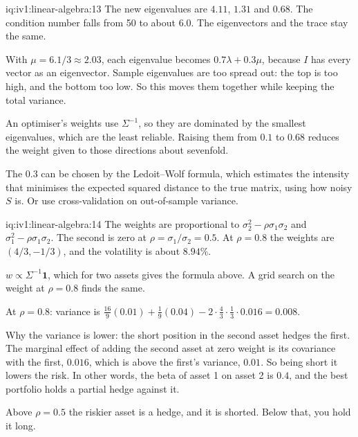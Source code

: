 \begin{solution}{iq:iv1:linear-algebra:13}
The new eigenvalues are $4.11$, $1.31$ and $0.68$. The condition number falls from 50 to about $6.0$. The eigenvectors and the trace stay the same.

With $\mu = 6.1/3 \approx 2.03$, each eigenvalue becomes $0.7\lambda + 0.3\mu$, because $I$ has every vector as an eigenvector. Sample eigenvalues are too spread out: the top is too high, and the bottom too low. So this moves them together while keeping the total variance.

An optimiser's weights use $\Sigma^{-1}$, so they are dominated by the smallest eigenvalues, which are the least reliable. Raising them from $0.1$ to $0.68$ reduces the weight given to those directions about sevenfold.

The $0.3$ can be chosen by the Ledoit--Wolf formula, which estimates the intensity that minimises the expected squared distance to the true matrix, using how noisy $S$ is. Or use cross-validation on out-of-sample variance.

\end{solution}

\begin{solution}{iq:iv1:linear-algebra:14}
The weights are proportional to $\sigma_2^2 - \rho\sigma_1\sigma_2$ and $\sigma_1^2 - \rho\sigma_1\sigma_2$. The second is zero at $\rho = \sigma_1/\sigma_2 = 0.5$. At $\rho = 0.8$ the weights are $(4/3, -1/3)$, and the volatility is about $8.94\%$.

$w \propto \Sigma^{-1}\mathbf{1}$, which for two assets gives the formula above. A grid search on the weight at $\rho = 0.8$ finds the same.

At $\rho = 0.8$: variance is $\frac{16}{9}(0.01) + \frac19(0.04) - 2 \cdot \frac43 \cdot \frac13 \cdot 0.016 = 0.008$.

Why the variance is lower: the short position in the second asset hedges the first. The marginal effect of adding the second asset at zero weight is its covariance with the first, $0.016$, which is above the first's variance, $0.01$. So being short it lowers the risk. In other words, the beta of asset 1 on asset 2 is $0.4$, and the best portfolio holds a partial hedge against it.

Above $\rho = 0.5$ the riskier asset is a hedge, and it is shorted. Below that, you hold it long.

\end{solution}

